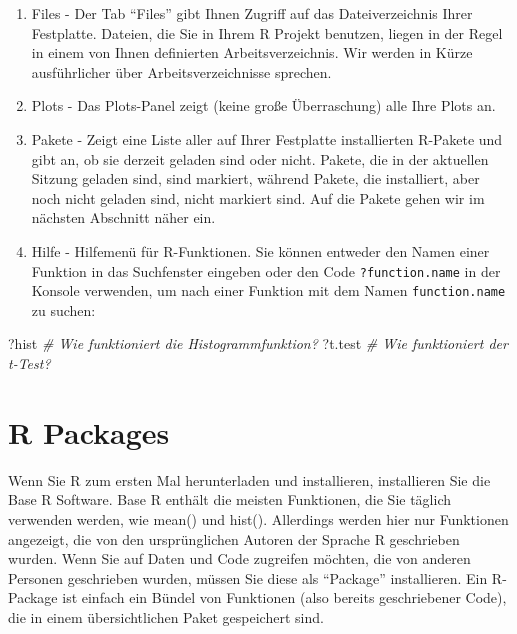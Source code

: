 \documentclass[
]{book}
\newenvironment{Shaded}{\begin{snugshade}}{\end{snugshade}}
\newcommand{\CommentTok}[1]{\textcolor[rgb]{0.56,0.35,0.01}{\textit{#1}}}
\newcommand{\NormalTok}[1]{#1}
\begin{document}
\begin{enumerate}
\def\labelenumi{\arabic{enumi}.}
\item
  Files - Der Tab ``Files'' gibt Ihnen Zugriff auf das Dateiverzeichnis Ihrer Festplatte. Dateien, die Sie in Ihrem R Projekt benutzen, liegen in der Regel in einem von Ihnen definierten Arbeitsverzeichnis. Wir werden in Kürze ausführlicher über Arbeitsverzeichnisse sprechen.
\item
  Plots - Das Plots-Panel zeigt (keine große Überraschung) alle Ihre Plots an.
\item
  Pakete - Zeigt eine Liste aller auf Ihrer Festplatte installierten R-Pakete und gibt an, ob sie derzeit geladen sind oder nicht. Pakete, die in der aktuellen Sitzung geladen sind, sind markiert, während Pakete, die installiert, aber noch nicht geladen sind, nicht markiert sind. Auf die Pakete gehen wir im nächsten Abschnitt näher ein.
\item
  Hilfe - Hilfemenü für R-Funktionen. Sie können entweder den Namen einer Funktion in das Suchfenster eingeben oder den Code \texttt{?function.name} in der Konsole verwenden, um nach einer Funktion mit dem Namen \texttt{function.name} zu suchen:
\end{enumerate}

\begin{Shaded}
\begin{Highlighting}[]
\NormalTok{?hist   }\CommentTok{\# Wie funktioniert die Histogrammfunktion?}
\NormalTok{?t.test }\CommentTok{\# Wie funktioniert der t{-}Test?}
\end{Highlighting}
\end{Shaded}

\hypertarget{r-packages}{%
\section{R Packages}\label{r-packages}}

Wenn Sie R zum ersten Mal herunterladen und installieren, installieren Sie die Base R Software.
Base R enthält die meisten Funktionen, die Sie täglich verwenden werden, wie mean() und hist().
Allerdings werden hier nur Funktionen angezeigt, die von den ursprünglichen Autoren der Sprache R geschrieben wurden.
Wenn Sie auf Daten und Code zugreifen möchten, die von anderen Personen geschrieben wurden, müssen Sie diese als ``Package'' installieren.
Ein R-Package ist einfach ein Bündel von Funktionen (also bereits geschriebener Code), die in einem übersichtlichen Paket gespeichert sind.
\end{document}
